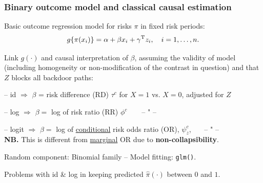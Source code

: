 \documentclass[12pt,dvipsnames,t,aspectratio=169, handout%
]{beamer}
\begin{document}
\begin{frame}

\frametitle{\large Binary outcome model and classical causal estimation}

\bi
\item
Basic outcome regression model for risks $\pi$ in fixed risk periods: %
$$ g\{\pi(x_i)\} = \alpha + \beta x_i + \gamma^{\small\text{T}} z_i, \quad i = 1, \dots, n.$$
\pause
\item
Link $g(\cdot)$ and causal interpretation of $\beta$, assuming the
validity of model (including homogeneity or non-modification of the contrast in question)
and that $Z$ blocks all backdoor paths:   
\bi
{\normalsize 
\item[--]  id $\Rightarrow$ $\beta$ = 
risk difference (RD) $\tau^c$ for $X=1$ vs. $X=0$, adjusted for $Z$
\item[--] log $\Rightarrow$ $\beta =$ 
log of risk ratio (RR) $\phi^c$\ \ \ \ -- " --
\item[--] logit $\Rightarrow$ $\beta =$ 
log of \underline{conditional} risk odds ratio (OR),  $\psi_z^c$, \ \ \ -- " -- \\
{\bf NB.} This is different from \underline{marginal} OR due to \textbf{non-collapsibility}.
}
\ei
\pause
\item
Random component: Binomial family -- Model fitting: \texttt{glm()}.
\item
Problems with id \& log in keeping predicted $\widehat\pi(\cdot)$ between $0$ and $1$. 
\ei
\end{frame}
\end{document}
